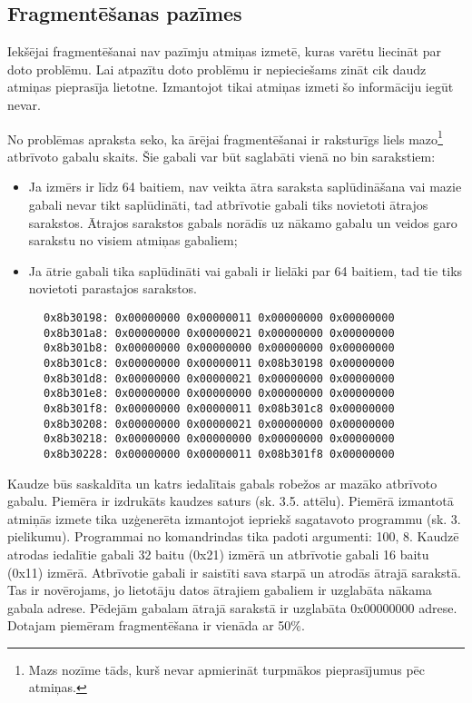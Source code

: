 \subsection{Fragmentēšanas pazīmes}

Iekšējai fragmentēšanai nav pazīmju atmiņas izmetē, kuras varētu liecināt par doto problēmu.
Lai atpazītu doto problēmu ir nepieciešams zināt cik daudz atmiņas pieprasīja lietotne.
Izmantojot tikai atmiņas izmeti šo informāciju iegūt nevar.

No problēmas apraksta seko, ka ārējai fragmentēšanai ir raksturīgs liels mazo\footnote{Mazs nozīme tāds, kurš nevar apmierināt turpmākos pieprasījumus pēc atmiņas.} atbrīvoto gabalu skaits.
Šie gabali var būt saglabāti vienā no bin sarakstiem:
\begin{itemize}
\item Ja izmērs ir līdz 64 baitiem, nav veikta ātra saraksta saplūdināšana vai mazie gabali nevar tikt saplūdināti, tad atbrīvotie gabali tiks novietoti ātrajos sarakstos.
Ātrajos sarakstos gabals norādīs uz nākamo gabalu un veidos garo sarakstu no visiem atmiņas gabaliem;
\item Ja ātrie gabali tika saplūdināti vai gabali ir lielāki par 64 baitiem, tad tie tiks novietoti parastajos sarakstos.
\end{itemize}
\begin{figure}[h]
\begin{lstlisting}[style=customgdb]
0x8b30198: 0x00000000 0x00000011 0x00000000 0x00000000
0x8b301a8: 0x00000000 0x00000021 0x00000000 0x00000000
0x8b301b8: 0x00000000 0x00000000 0x00000000 0x00000000
0x8b301c8: 0x00000000 0x00000011 0x08b30198 0x00000000
0x8b301d8: 0x00000000 0x00000021 0x00000000 0x00000000
0x8b301e8: 0x00000000 0x00000000 0x00000000 0x00000000
0x8b301f8: 0x00000000 0x00000011 0x08b301c8 0x00000000
0x8b30208: 0x00000000 0x00000021 0x00000000 0x00000000
0x8b30218: 0x00000000 0x00000000 0x00000000 0x00000000
0x8b30228: 0x00000000 0x00000011 0x08b301f8 0x00000000
\end{lstlisting}
\caption{\textbf{\fontsize{11}{12}\selectfont {Fragmentētā kaudze}}}
\end{figure}

Kaudze būs saskaldīta un katrs iedalītais gabals robežos ar mazāko atbrīvoto gabalu.
Piemēra ir izdrukāts kaudzes saturs (sk. 3.5. attēlu).
Piemērā izmantotā atmiņās izmete tika uzģenerēta izmantojot iepriekš sagatavoto programmu (sk. 3. pielikumu).
Programmai no komandrindas tika padoti argumenti: 100, 8.
Kaudzē atrodas iedalītie gabali 32 baitu (0x21) izmērā un atbrīvotie gabali 16 baitu (0x11) izmērā.
Atbrīvotie gabali ir saistīti sava starpā un atrodās ātrajā sarakstā.
Tas ir novērojams, jo lietotāju datos ātrajiem gabaliem ir uzglabāta nākama gabala adrese.
Pēdejām gabalam ātrajā sarakstā ir uzglabāta 0x00000000 adrese.
Dotajam piemēram fragmentēšana ir vienāda ar 50\%.


